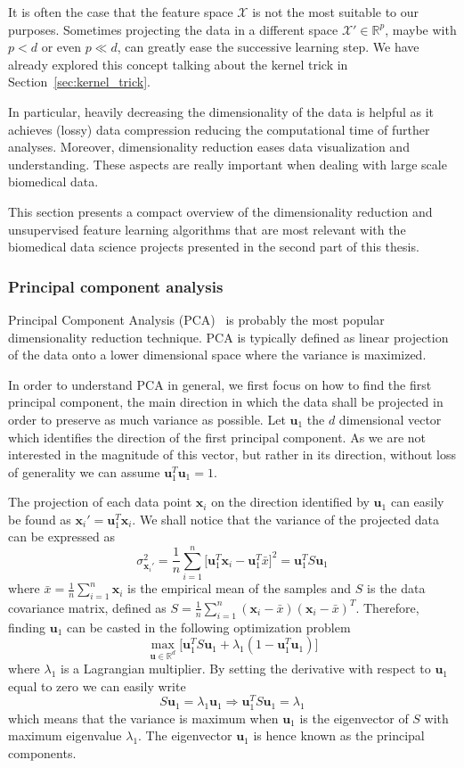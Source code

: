 	It is often the case that the feature space $\mathcal{X}$ is not the most suitable to our purposes. Sometimes projecting the data in a different space $\mathcal{X}' \in \mathbb{R}^p$, maybe with $p<d$ or even $p \ll d$, can greatly ease the successive learning step. We have already explored this concept talking about the kernel trick in Section~\ref{sec:kernel_trick}.
	
	In particular, heavily decreasing the dimensionality of the data is helpful as it achieves (lossy) data compression reducing the computational time of further analyses. Moreover, dimensionality reduction eases data visualization and understanding. These aspects are really important when dealing with large scale biomedical data.
	
	This section presents a compact overview of the dimensionality reduction and unsupervised feature learning algorithms that are most relevant with the biomedical data science projects presented in the second part of this thesis.
	
	\subsubsection{Principal component analysis} \label{sec:pca}
	
	Principal Component Analysis (\ac{PCA})~\cite{jolliffe2002principal} is probably the most popular dimensionality reduction technique. PCA is typically defined as linear projection of the data onto a lower dimensional space where the variance is maximized.
	
	In order to understand PCA in general, we first focus on how to find the first principal component, \ie the main direction in which the data shall be projected in order to preserve as much variance as possible. Let $\bm{u}_1$ the $d$ dimensional vector which identifies the direction of the first principal component. As we are not interested in the magnitude of this vector, but rather in its direction, without loss of generality we can assume $\bm{u}_1^T\bm{u}_1 = 1$.
	
	The projection of each data point $\bm{x}_i$ on the direction identified by $\bm{u}_1$ can easily be found as $\bm{x}_i' = \bm{u}_1^T\bm{x}_i$. We shall notice that the variance of the projected data can be expressed as
	$$
	\sigma^2_{\bm{x}_i'} = \frac{1}{n} \sum_{i=1}^n \big[\bm{u}_1^T\bm{x}_i - \bm{u}_1^T\bar{x}\big]^2 = \bm{u}_1^T S \bm{u}_1
	$$
	where $\bar{x} = \frac{1}{n} \sum_{i=1}^n \bm{x}_i$ is the empirical mean of the samples and $S$ is the data covariance matrix, defined as $S = \frac{1}{n} \sum_{i=1}^n (\bm{x}_i - \bar{x})(\bm{x}_i - \bar{x})^T$. Therefore, finding $\bm{u}_1$ can be casted in the following optimization problem
	$$
	\max_{\bm{u} \in \mathbb{R}^d} \big[ \bm{u}_1^T S \bm{u}_1 + \lambda_1 (1 - \bm{u}_1^T  \bm{u}_1) \big]
	$$
	where $\lambda_1$ is a Lagrangian multiplier. By setting the derivative with respect to $\bm{u}_1$ equal to zero we can easily write
	$$
	S \bm{u}_1 = \lambda_1 \bm{u}_1 \Rightarrow \bm{u}_1^T S \bm{u}_1 = \lambda_1
	$$
	which means that the variance is maximum when $\bm{u}_1$ is the eigenvector of $S$ with maximum eigenvalue $\lambda_1$. The eigenvector $\bm{u}_1$ is hence known as the principal components.
	
